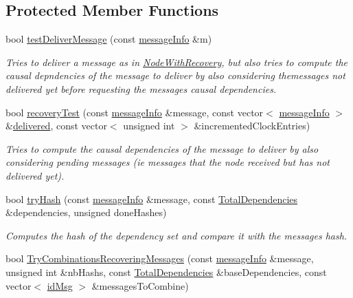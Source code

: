 \subsection*{Protected Member Functions}
\begin{DoxyCompactItemize}
\item 
bool \hyperlink{class_node_with_recovery_test_af9b78d0ed4fefb97e2f54c9279aa4655}{test\+Deliver\+Message} (const \hyperlink{structures_8h_a7e7bdc1d2fff8a9436f2f352b2711ed6}{message\+Info} \&m)
\begin{DoxyCompactList}\small\item\em Tries to deliver a message as in \hyperlink{class_node_with_recovery}{Node\+With\+Recovery}, but also tries to compute the causal depndencies of the message to deliver by also considering themessages not delivered yet before requesting the message\textquotesingle{}s causal dependencies. \end{DoxyCompactList}\item 
bool \hyperlink{class_node_with_recovery_test_a8e4f79eeb8c415ceca21b82f22eb9038}{recovery\+Test} (const \hyperlink{structures_8h_a7e7bdc1d2fff8a9436f2f352b2711ed6}{message\+Info} \&message, const vector$<$ \hyperlink{structures_8h_a7e7bdc1d2fff8a9436f2f352b2711ed6}{message\+Info} $>$ \&\hyperlink{class_node_with_control_aed34cc5a5b277c43f10f8cbbbeb59327}{delivered}, const vector$<$ unsigned int $>$ \&incremented\+Clock\+Entries)
\begin{DoxyCompactList}\small\item\em Tries to compute the causal dependencies of the message to deliver by also considering pending messages (ie messages that the node received but has not delivered yet). \end{DoxyCompactList}\item 
bool \hyperlink{class_node_with_recovery_test_a5417b50e5d5e272c8ef70ff962c0ea86}{try\+Hash} (const \hyperlink{structures_8h_a7e7bdc1d2fff8a9436f2f352b2711ed6}{message\+Info} \&message, const \hyperlink{class_total_dependencies}{Total\+Dependencies} \&dependencies, unsigned done\+Hashes)
\begin{DoxyCompactList}\small\item\em Computes the hash of the dependency set and compare it with the message\textquotesingle{}s hash. \end{DoxyCompactList}\item 
bool \hyperlink{class_node_with_recovery_test_ae1d2089be117daef7b2ee4dfd6b92e7d}{Try\+Combinations\+Recovering\+Messages} (const \hyperlink{structures_8h_a7e7bdc1d2fff8a9436f2f352b2711ed6}{message\+Info} \&message, unsigned int \&nb\+Hashs, const \hyperlink{class_total_dependencies}{Total\+Dependencies} \&base\+Dependencies, const vector$<$ \hyperlink{structures_8h_a83a1d9a070efa5341da84cfd8e28d3e5}{id\+Msg} $>$ \&messages\+To\+Combine)

\end{DoxyCompactItemize}
